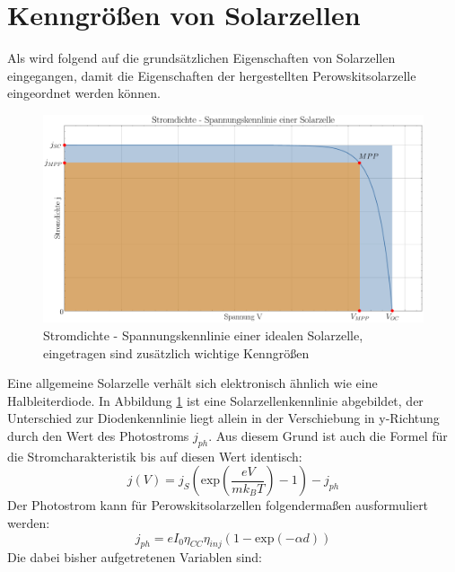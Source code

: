 \documentclass[12pt,a4paper,ngerman]{report}
\begin{document}
	\section{Kenngrößen von Solarzellen}\label{ch:Kenngrößen}
	Als wird folgend auf die grundsätzlichen Eigenschaften von Solarzellen eingegangen, damit die Eigenschaften der hergestellten Perowskitsolarzelle eingeordnet werden können.\\
	\begin{figure}[ht]
		\centering
		\includegraphics[width=\textwidth]{Bilder/SolarzelleIdeal.pdf}		
		\caption[Kennlinie ideale Solarzelle]{Stromdichte - Spannungskennlinie einer idealen Solarzelle, eingetragen sind zusätzlich wichtige Kenngrößen}
		\label{img:SolarzelleIdeal}
	\end{figure}
	Eine allgemeine Solarzelle verhält sich elektronisch ähnlich wie eine Halbleiterdiode. In Abbildung \ref{img:SolarzelleIdeal} ist eine Solarzellenkennlinie abgebildet, der Unterschied zur Diodenkennlinie liegt allein in der Verschiebung in y-Richtung durch den Wert des Photostroms $j_{ph}$. Aus diesem Grund ist auch die Formel für die Stromcharakteristik bis auf diesen Wert identisch:
	\begin{equation}\label{eq:kennlinie}
		j(V) =  j_S \left(\text{exp}\left(\frac{e V}{m k_B T}\right) - 1\right) - j_{ph}
	\end{equation} 
	Der Photostrom kann für Perowskitsolarzellen folgendermaßen ausformuliert werden:
	\begin{equation}
		j_{ph} = e I_0 \eta_{CC} \eta_{inj} (1-\text{exp}(-\alpha d))
	\end{equation}
	Die dabei bisher aufgetretenen Variablen sind:
\end{document}
